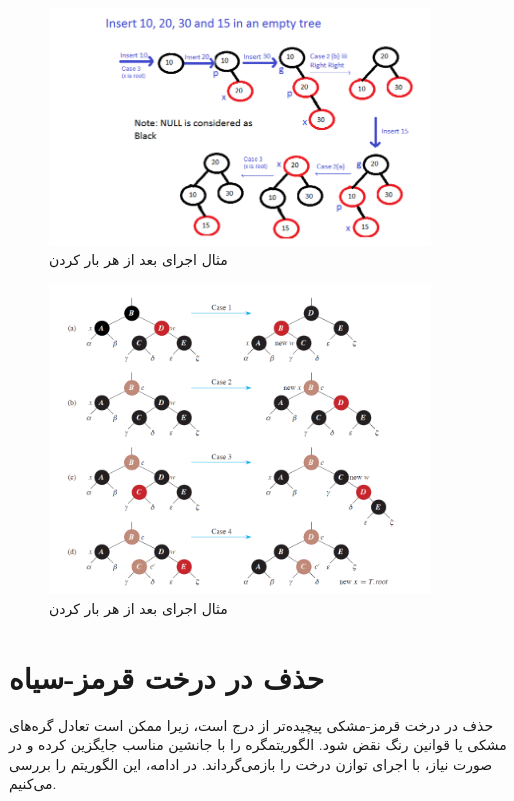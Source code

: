 \documentclass[a4paper,12pt]{article}
\begin{document}
	\begin{figure}[H]
	\centering
	\includegraphics[width=0.9\textwidth]{img/insert-fixup.png} %
	\caption{مثال اجرای    بعد از هر بار    کردن}
	
	\end{figure}
		\begin{figure}[H]
		\centering
		\includegraphics[width=0.9\textwidth]{img/insert-fixup2.png} %
		\caption{مثال اجرای    بعد از هر بار    کردن}
	\end{figure}
	
	
	\section{حذف در درخت قرمز-سیاه}

	
حذف در درخت قرمز-مشکی پیچیده‌تر از درج است، زیرا ممکن است تعادل گره‌های مشکی یا قوانین رنگ نقض شود.
الگوریتمگره را با جانشین مناسب جایگزین کرده و در صورت نیاز، با اجرای  توازن درخت را بازمی‌گرداند.
در ادامه، این الگوریتم را بررسی می‌کنیم.
	
\end{document}
